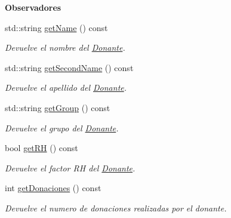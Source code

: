 \begin{Indent}{\bf Observadores}\par
\begin{DoxyCompactItemize}
\item 
std\+::string \hyperlink{classed_1_1Donante_ae76f1220582f41d257d2f91f7addc858}{get\+Name} () const 
\begin{DoxyCompactList}\small\item\em Devuelve el nombre del \hyperlink{classed_1_1Donante}{Donante}. \end{DoxyCompactList}\item 
std\+::string \hyperlink{classed_1_1Donante_ace0406348e755517d3e80ceff18a2f59}{get\+Second\+Name} () const 
\begin{DoxyCompactList}\small\item\em Devuelve el apellido del \hyperlink{classed_1_1Donante}{Donante}. \end{DoxyCompactList}\item 
std\+::string \hyperlink{classed_1_1Donante_a0b1e59193e6c887a7232d48b71bfae33}{get\+Group} () const 
\begin{DoxyCompactList}\small\item\em Devuelve el grupo del \hyperlink{classed_1_1Donante}{Donante}. \end{DoxyCompactList}\item 
bool \hyperlink{classed_1_1Donante_aed957d321e76a3a907849d4cf0f438ee}{get\+RH} () const 
\begin{DoxyCompactList}\small\item\em Devuelve el factor RH del \hyperlink{classed_1_1Donante}{Donante}. \end{DoxyCompactList}\item 
int \hyperlink{classed_1_1Donante_ae0255405dc76a90d2ea383cd8abd4d43}{get\+Donaciones} () const 
\begin{DoxyCompactList}\small\item\em Devuelve el numero de donaciones realizadas por el donante. \end{DoxyCompactList}\end{DoxyCompactItemize}
\end{Indent}
